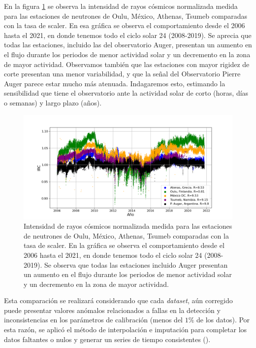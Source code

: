 En la figura \ref{NM_compar} se observa la intensidad de rayos cósmicos normalizada medida para las estaciones de neutrones de Oulu, México, Athenas, Tsumeb comparadas con la tasa de scaler. En esa gráfica se observa el comportamiento desde el 2006 hasta el 2021, en donde tenemos todo el ciclo solar 24 (2008-2019). Se aprecia que todas las estaciones, incluido las del observatorio Auger, presentan un aumento en el flujo durante los periodos de menor actividad solar y un decremento en la zona de mayor actividad. Observamos también que las estaciones con mayor rigidez de corte presentan una menor variabilidad, y que la señal del Observatorio Pierre Auger parece estar mucho más atenuada. Indagaremos esto, estimando la sensibilidad que tiene el observatorio ante la actividad solar de corto (horas, días o semanas) y largo plazo (años).
\begin{figure}
\centering
    \includegraphics[width=0.8\linewidth]{Figs/Figr/NM_Auger_comparison.png}
    \caption[Diagrama esquemático del monitor de neutrones 6-NM64 ubicado en Atenas, Grecia.]{Intensidad de rayos cósmicos normalizada medida para las estaciones de neutrones de Oulu, México, Athenas, Tsumeb comparadas con la tasa de scaler. En la gráfica se observa el comportamiento desde el 2006 hasta el 2021, en donde tenemos todo el ciclo solar 24 (2008-2019). Se observa que todas las estaciones incluido Auger presentan un aumento en el flujo durante los periodos de menor actividad solar y un decremento en la zona de mayor actividad.}
    \label{NM_compar}
\end{figure}
Esta comparación se realizará considerando que cada \textit{dataset}, aún corregido puede presentar valores anómalos relacionados a fallas en la detección y inconsistencias en los parámetros de calibración (menos del $1\%$ de los datos). Por esta razón, se aplicó el método de interpolación e imputación para completar los datos faltantes o nulos y generar un series de tiempo consistentes (\cite{wang_2019}).

